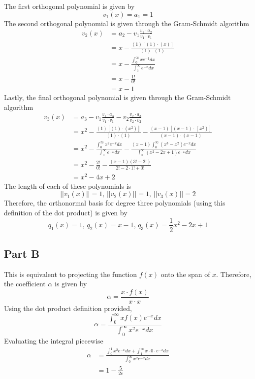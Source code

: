 \documentclass{article}
\begin{document}
The first orthogonal polynomial is given by
$$ v_1(x) = a_1 = 1 $$
The second orthogonal polynomial is given through the Gram-Schmidt algorithm
\begin{align*}
    v_2(x) &= a_2 - v_1 \frac{v_1 \cdot a_2}{v_1 \cdot v_1} \\
    &= x - \frac{(1) [(1) \cdot (x)]}{(1) \cdot (1)} \\
    &= x - \frac{\int_0^{\infty} x e^{-1} dx}{\int_0^{\infty} e^{-x} dx} \\
    &= x - \frac{1!}{0!} \\
    &= x - 1
\end{align*}
Lastly, the final orthogonal polynomial is given through the Gram-Schmidt
algorithm
\begin{align*}
    v_3(x) &= a_3 - v_1 \frac{v_1 \cdot a_3}{v_1 \cdot v_1} - v_2 \frac{v_2 \cdot a_3}{v_2 \cdot v_2} \\
    &= x^2 - \frac{(1) [(1) \cdot (x^2)]}{(1) \cdot (1)} - \frac{(x - 1) [(x - 1) \cdot (x^2)]}{(x - 1) \cdot (x - 1)} \\
    &= x^2 - \frac{\int_0^\infty x^2 e^{-x} dx}{\int_0^\infty e^{-x} dx} - \frac{(x - 1) \int_0^\infty (x^3 - x^2) e^{-x} dx}{\int_0^\infty (x^2 -2x + 1) e^{-x} dx} \\
    &= x^2 - \frac{2!}{0!} - \frac{(x - 1) (3! - 2!)}{2! - 2 \cdot 1! + 0!} \\
    &= x^2 - 4x + 2
\end{align*}
The length of each of these polynomials is 
$$ || v_1(x) || = 1,\, || v_2(x) || = 1,\, || v_3(x) || = 2 $$
Therefore, the orthonormal basis for degree three polynomials (using this
definition of the dot product) is given by
$$ q_1(x) = 1,\, q_2(x) = x - 1,\, q_3(x) = \frac{1}{2} x^2 - 2x + 1 $$

\subsection*{Part B}

This is equivalent to projecting the function $f(x)$ onto the span of $x$.
Therefore, the coefficient $\alpha$ is given by
$$ \alpha = \frac{x \cdot f(x)}{x \cdot x} $$
Using the dot product definition provided,
$$ \alpha = \frac{\int_0^\infty x f(x) e^{-x} dx}{\int_0^\infty x^2 e^{-x}
dx} $$
Evaluating the integral piecewise
\begin{align*}
    \alpha &= \frac{\int_0^1 x^2 e^{-x} dx + \int_1^\infty x \cdot 0 \cdot
    e^{-x} dx}{\int_0^\infty x^2 e^{-x} dx} \\
    &= 1 - \frac{5}{2 e}
\end{align*}
\end{document}
